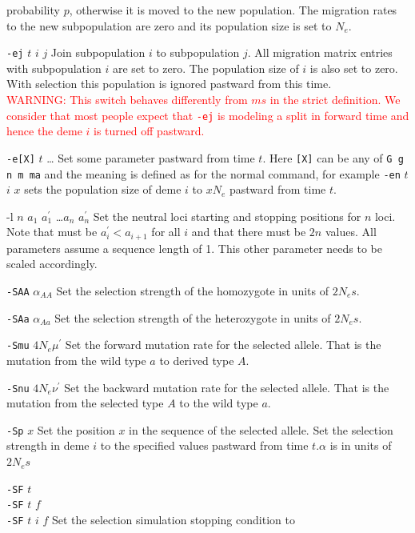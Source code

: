 \documentclass{article}
\begin{document}
\begin{eqlist*}
probability $p$, otherwise it is moved to the new population. The migration
rates to the new subpopulation are zero and its population size is set to $N_e$. 
\item[{\tt -ej} $t$ $i$ $j$] Join subpopulation $i$ to subpopulation $j$. All
migration matrix entries with subpopulation $i$ are set to zero. The population
size of $i$ is also set to zero. With selection this population is ignored
pastward from this time.\\
\textcolor{red}{WARNING: This switch behaves differently from $ms$ in the strict
definition. We consider that most people expect that {\tt -ej} is modeling a 
split in forward time and hence the deme $i$ is turned off pastward. }
\item[{\tt -e[X]} $t$ \ldots] Set some parameter pastward from time $t$. Here
{\tt [X]} can be any of {\tt G g n m ma} and the meaning is defined as for the
normal command, for example {\tt -en} $t$ $i$ $x$ sets the population size of
deme $i$ to $xN_e$ pastward from time $t$.
\item[{-l} $n$ $a_1$ $a_1^{'}$ \ldots $a_n$ $a_n^{'}$] Set the neutral loci
starting and stopping positions for $n$ loci. Note that must be $a_i^{'}<a_{i+1}$
for all $i$ and that there must be $2n$ values. All parameters assume a
sequence length of 1. This other parameter needs to be scaled accordingly.   
\item[{\tt -SAA} $\alpha_{AA}$] Set the selection strength of the homozygote in
units of $2N_es$.
\item[{\tt -SAa} $\alpha_{Aa}$] Set the selection strength of the heterozygote
in units of $2N_es$.
\item[{\tt -Smu} $4N_e\mu^{'}$] Set the forward mutation rate for the selected
allele. That is the mutation from the wild type $a$ to
derived type $A$.
\item[{\tt -Snu} $4N_e\nu^{'}$] Set the backward mutation rate for the selected
allele. That is the mutation from the selected type
$A$ to the wild type $a$.
\item[{\tt -Sp} $x$] Set the position $x$ in the sequence of the selected allele.
 Set the
selection strength in deme $i$ to the specified values pastward from time
$t$.$\alpha$ is in units of $2N_es$
\item[{\tt -SF} $t$ \\{\tt -SF} $t$ $f$ \\{\tt -SF} $t$ $i$ $f$] 
Set the selection simulation stopping condition to

\end{eqlist*}
\end{document}
